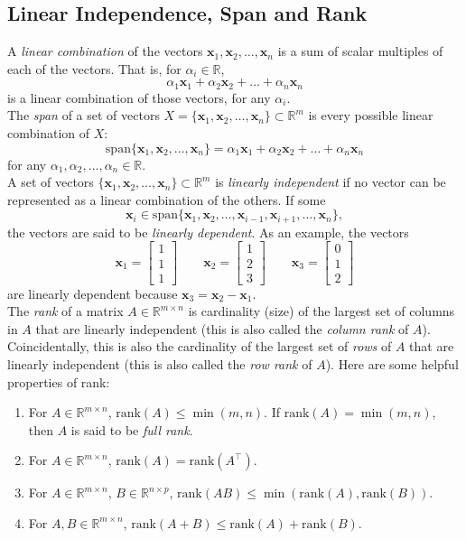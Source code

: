 \documentclass{article}
\newcommand{\1}{\mathbf{1}}
\newcommand{\0}{\mathbf{0}}
\newcommand{\xx}{\mathbf{x}}
\newcommand{\RR}{\mathbb{R}}
\newcommand{\T}{\top}
\newcommand{\rank}{\mathrm{rank}}
\newcommand{\m}[1]{\begin{bmatrix} #1 \end{bmatrix}}
\begin{document}
\subsection{Linear Independence, Span and Rank}

A \textit{linear combination} of the vectors $\xx_1,\xx_2,\dots,\xx_n$ is a sum
of scalar multiples of each of the vectors. That is, for $\alpha_i\in\RR$,
\[
    \alpha_1\xx_1 + \alpha_2\xx_2 + \dots + \alpha_n\xx_n
\]
is a linear combination of those vectors, for any $\alpha_i$.\\

The \textit{span} of a set of vectors $X = \{\xx_1,\xx_2,\dots,\xx_n\} \subset \RR^m$
is every possible linear combination of $X$:
\[
    \mathrm{span}\{\xx_1,\xx_2,\dots,\xx_n\} = \alpha_1\xx_1 + \alpha_2\xx_2 + \dots + \alpha_n\xx_n
\]
for any $\alpha_1,\alpha_2,\dots,\alpha_n\in\RR$.\\

A set of vectors $\{\xx_1,\xx_2,\dots,\xx_n\} \subset \RR^m$ is
\textit{linearly independent} if no vector can be represented as
a linear combination of the others. If some
\[
    \xx_i \in \mathrm{span}\{\xx_1,\xx_2,\dots, \xx_{i-1}, \xx_{i+1},\dots,\xx_n\},
\]
the vectors are said to be \textit{linearly dependent}. As an example,
the vectors
\[
    \xx_1 = \m{1\\1\\1} \qquad \xx_2 = \m{1\\2\\3} \qquad \xx_3 = \m{0\\1\\2}
\]
are linearly dependent because $\xx_3 = \xx_2-\xx_1$.\\

The \textit{rank} of a matrix $A\in\RR^{m\times n}$ is cardinality (size) of the largest set of
columns in $A$ that are linearly independent (this is also called the \textit{column rank} of $A$).
Coincidentally, this is also the cardinality of the largest set of \textit{rows} of $A$ that are 
linearly independent (this is also called the \textit{row rank} of $A$). Here are some helpful
properties of rank:
\begin{enumerate}
\item For $A\in\RR^{m\times n}$, $\rank(A)\leq\min(m,n)$. If $\rank(A)=\min(m,n)$, then $A$
    is said to be \textit{full rank}.
\item For $A\in\RR^{m\times n}$, $\rank(A) = \rank(A^\T)$.
\item For $A\in\RR^{m\times n}$, $B\in\RR^{n\times p}$, $\rank(AB)\leq \min(\rank(A),\rank(B))$.
\item For $A,B\in\RR^{m\times n}$, $\rank(A+B)\leq \rank(A) + \rank(B)$.
\end{enumerate}
\end{document}
